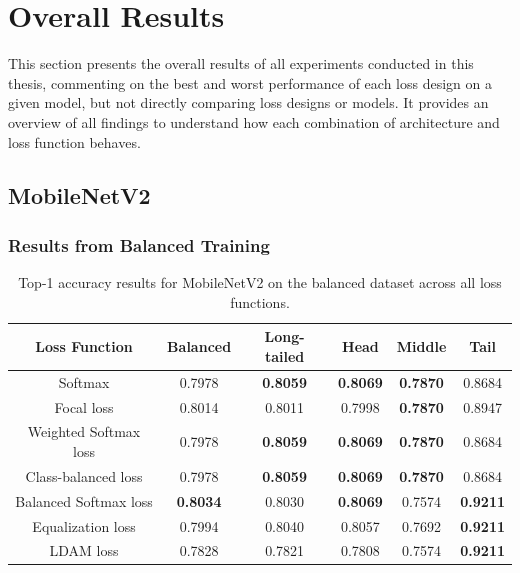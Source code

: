 \section{Overall Results}
This section presents the overall results of all experiments conducted in this thesis, commenting on the best and worst performance of each loss design on a given model, but not directly comparing loss designs or models. It provides an overview of all findings to understand how each combination of architecture and loss function behaves.


\subsection{MobileNetV2}

\subsubsection{Results from Balanced Training}

\begin{table}[H]
    \centering
    \caption{Top-1 accuracy results for MobileNetV2 on the balanced dataset across all loss functions.}
    \begin{tabular}{cccccc}
        \toprule
        Loss Function & Balanced & Long-tailed & Head & Middle & Tail \\ 
        \midrule
        Softmax   & 0.7978   & \textbf{0.8059} & \textbf{0.8069} & \textbf{0.7870} & 0.8684 \\
        Focal loss   & 0.8014   & 0.8011 & 0.7998 & \textbf{0.7870} & 0.8947 \\
        Weighted Softmax loss   & 0.7978   & \textbf{0.8059} & \textbf{0.8069} & \textbf{0.7870} & 0.8684 \\
        Class-balanced loss   & 0.7978   & \textbf{0.8059} & \textbf{0.8069} & \textbf{0.7870} & 0.8684 \\
        Balanced Softmax loss   & \textbf{0.8034}  & 0.8030 & \textbf{0.8069} & 0.7574 & \textbf{0.9211} \\
        Equalization loss   & 0.7994   & 0.8040 & 0.8057 & 0.7692 & \textbf{0.9211} \\
        LDAM loss   &  0.7828   & 0.7821 & 0.7808 & 0.7574 & \textbf{0.9211} \\
        \bottomrule
    \end{tabular}
    \label{tab:mobilenet_bal_acc1_1}
\end{table}

